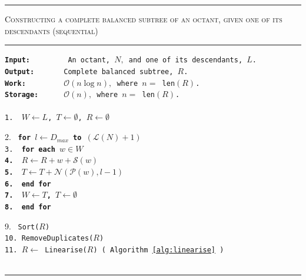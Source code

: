 \begin{table} 
\centering
\rule{\textwidth}{0.01mm}
\begin{algorithm}{ \textsc{Constructing a complete balanced subtree of an octant, given one of its descendants (sequential)}}
\rule{\textwidth}{0.01mm}
\flushleft
\tt{\bf{Input:~~~~~~~~}} An octant, $N,$ and one of its descendants, $L$.\\
  \tt{\bf{Output:~~~~~~}} Complete balanced subtree, $R$.\\
  \tt{\bf{Work:~~~~~~~~}} $\mathcal{O}(n\log n),$ where $n = $ len$(R)$.\\
  \tt{\bf{Storage:~~~~~}} $\mathcal{O}(n),$ where $n = $ len$(R)$.\\
~\\
1.~ \tt{$W \leftarrow L$, $T \leftarrow \emptyset$, $R \leftarrow \emptyset$}\\ 
\begin{tabbing}		
2.~ \tt{\bf for} \= \tt{$l \leftarrow D_{max}$ \bf{to} $(\mathcal{L}(N)+1)$}\\
3.~      \> \tt{\bf for} \=\bf{each} {$w \in W$}\\
4.~      \> \> $R \leftarrow R + w + \mathcal{S}(w)$\\
5.~      \> \> $T \leftarrow T + \mathcal{N}\left(\mathcal{P}(w),l-1\right)$\\
6.~			\> \tt{\bf end for}\\
7.~      \>  $W \leftarrow T$, $T \leftarrow \emptyset$\\
8.~			\tt{\bf end for}
\end{tabbing}
9.~ \tt{Sort($R$)}\\
10. \tt{RemoveDuplicates($R$)}\\
11. $R \leftarrow$ Linearise($R$) ( Algorithm \ref{alg:linearise} )\\
\label{alg:conBal}
\end{algorithm}
\rule{\textwidth}{0.01mm}
\end{table}

